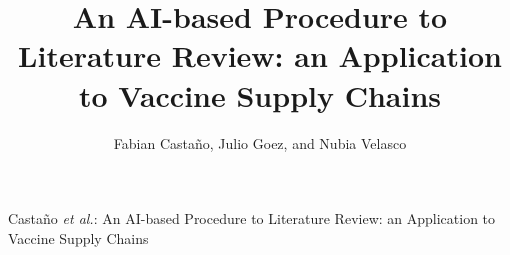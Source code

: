 \documentclass[journal,onecolumn]{IEEEtran}
\begin{document}
%
\title{An AI-based Procedure to Literature Review: an Application to Vaccine Supply Chains}
%
%
%
\author{Fabian Castaño, Julio Goez, and Nubia Velasco}

% 
%



%
{Castaño \MakeLowercase{\textit{et al.}}: An AI-based Procedure to Literature Review: an Application to Vaccine Supply Chains}


\maketitle
\end{document}
